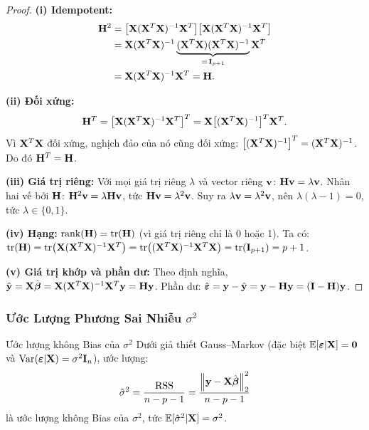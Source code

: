\begin{proof}
\textbf{(i) Idempotent:}
\begin{align*}
    \mathbf{H}^2
    &= \bigl[\mathbf{X}(\mathbf{X}^T\mathbf{X})^{-1}\mathbf{X}^T\bigr]
       \bigl[\mathbf{X}(\mathbf{X}^T\mathbf{X})^{-1}\mathbf{X}^T\bigr] \\
    &= \mathbf{X}(\mathbf{X}^T\mathbf{X})^{-1}
       \underbrace{(\mathbf{X}^T\mathbf{X})(\mathbf{X}^T\mathbf{X})^{-1}}_{=\,\mathbf{I}_{p+1}}
       \mathbf{X}^T \\
    &= \mathbf{X}(\mathbf{X}^T\mathbf{X})^{-1}\mathbf{X}^T = \mathbf{H}.
\end{align*}

\medskip
\textbf{(ii) Đối xứng:}
\[
    \mathbf{H}^T
    = \bigl[\mathbf{X}(\mathbf{X}^T\mathbf{X})^{-1}\mathbf{X}^T\bigr]^T
    = \mathbf{X}\bigl[(\mathbf{X}^T\mathbf{X})^{-1}\bigr]^T\mathbf{X}^T.
\]
Vì $\mathbf{X}^T\mathbf{X}$ đối xứng, nghịch đảo của nó cũng đối xứng:
$\bigl[(\mathbf{X}^T\mathbf{X})^{-1}\bigr]^T = (\mathbf{X}^T\mathbf{X})^{-1}$.
Do đó $\mathbf{H}^T = \mathbf{H}$.

\medskip
\textbf{(iii) Giá trị riêng:} Với mọi giá trị riêng $\lambda$ và vector riêng $\mathbf{v}$:
$\mathbf{H}\mathbf{v} = \lambda\mathbf{v}$. Nhân hai vế bởi $\mathbf{H}$:
$\mathbf{H}^2\mathbf{v} = \lambda\mathbf{H}\mathbf{v}$, tức $\mathbf{H}\mathbf{v} = \lambda^2\mathbf{v}$.
Suy ra $\lambda\mathbf{v} = \lambda^2\mathbf{v}$, nên $\lambda(\lambda - 1) = 0$,
tức $\lambda \in \{0, 1\}$.

\medskip
\textbf{(iv) Hạng:} $\operatorname{rank}(\mathbf{H}) = \operatorname{tr}(\mathbf{H})$ (vì giá trị riêng chỉ là 0 hoặc 1).
Ta có:
$\operatorname{tr}(\mathbf{H}) = \operatorname{tr}\bigl(\mathbf{X}(\mathbf{X}^T\mathbf{X})^{-1}\mathbf{X}^T\bigr)
= \operatorname{tr}\bigl((\mathbf{X}^T\mathbf{X})^{-1}\mathbf{X}^T\mathbf{X}\bigr) = \operatorname{tr}(\mathbf{I}_{p+1}) = p+1$.

\medskip
\textbf{(v) Giá trị khớp và phần dư:}
Theo định nghĩa, $\hat{\mathbf{y}} = \mathbf{X}\hat{\boldsymbol{\beta}}
= \mathbf{X}(\mathbf{X}^T\mathbf{X})^{-1}\mathbf{X}^T\mathbf{y} = \mathbf{H}\mathbf{y}$.
Phần dư: $\hat{\boldsymbol{\varepsilon}} = \mathbf{y} - \hat{\mathbf{y}}
= \mathbf{y} - \mathbf{H}\mathbf{y} = (\mathbf{I} - \mathbf{H})\mathbf{y}$.
\end{proof}

\subsubsection{Ước Lượng Phương Sai Nhiễu $\sigma^2$}

\begin{mythm}{Ước lượng không Bias của $\sigma^2$}{}
Dưới giả thiết Gauss--Markov (đặc biệt $\mathbb{E}[\boldsymbol{\varepsilon}|\mathbf{X}] = \mathbf{0}$
và $\mathrm{Var}(\boldsymbol{\varepsilon}|\mathbf{X}) = \sigma^2\mathbf{I}_n$), ước lượng:
\[
    \hat{\sigma}^2
    = \frac{\mathrm{RSS}}{n - p - 1}
    = \frac{\left\lVert\mathbf{y} - \mathbf{X}\hat{\boldsymbol{\beta}}\right\rVert_2^2}{n - p - 1}
\]
là ước lượng không Bias của $\sigma^2$, tức $\mathbb{E}[\hat{\sigma}^2|\mathbf{X}] = \sigma^2$.
\end{mythm}

